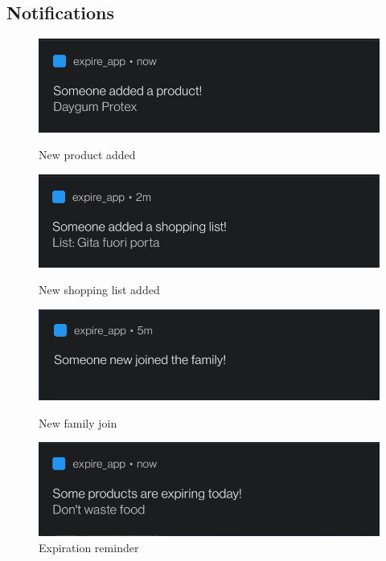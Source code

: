 \subsection{Notifications}

\begin{figure}[h]
\begin{multicols}{2}
    \includegraphics[width=\linewidth]{Images/notifications/new_product.png}\caption{New product added}\par 
    \includegraphics[width=\linewidth]{Images/notifications/new_shopping_list.png}\caption{New shopping list added}\par 
    \end{multicols}
\begin{multicols}{2}
    \includegraphics[width=\linewidth]{Images/notifications/new_user_family.png}\caption{New family join}\par
    \includegraphics[width=\linewidth]{Images/notifications/expiring_notification.png}\caption{Expiration reminder}\par
\end{multicols}
\end{figure}

